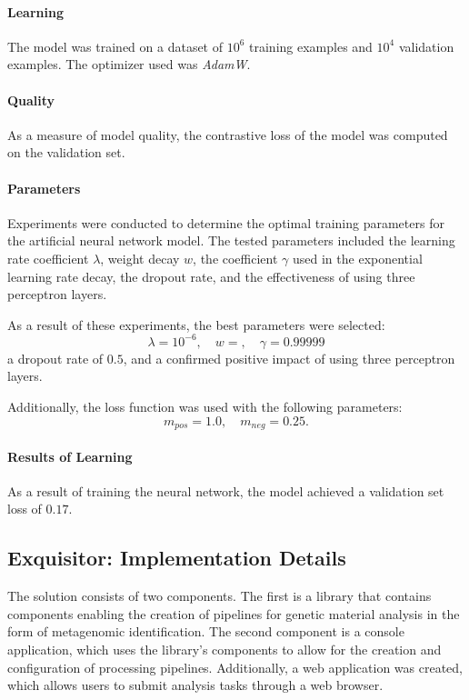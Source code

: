 \documentclass[pdflatex,sn-vancouver-num]{sn-jnl}%
\begin{document}
                \paragraph{Learning}
                The model was trained on a dataset of $10^{6}$ training examples and $10^{4}$ validation examples. The optimizer used was \textit{AdamW}\cite{Loshchilov2017DecoupledWD}.

                \paragraph{Quality}
                As a measure of model quality, the contrastive loss of the model was computed on the validation set.

                \paragraph{Parameters}
                Experiments were conducted to determine the optimal training parameters for the artificial neural network model. The tested parameters included the learning rate coefficient \( \lambda \), weight decay \( w \), the coefficient \( \gamma \) used in the exponential learning rate decay, the dropout rate, and the effectiveness of using three perceptron layers.

                As a result of these experiments, the best parameters were selected:
                \[
                \lambda = 10^{-6}, \quad w = , \quad \gamma = 0.99999
                \]
                a dropout rate of \( 0.5 \), and a confirmed positive impact of using three perceptron layers.

                Additionally, the loss function was used with the following parameters:
                \[
                m_{pos} = 1.0, \quad m_{neg} = 0.25.
                \]


                \paragraph{Results of Learning}
                As a result of training the neural network, the model achieved a validation set loss of $0.17$.


        \subsection{Exquisitor: Implementation Details}
            The solution consists of two components. The first is a library that contains components enabling the creation of pipelines for genetic material analysis in the form of metagenomic identification. The second component is a console application, which uses the library's components to allow for the creation and configuration of processing pipelines. Additionally, a web application was created, which allows users to submit analysis tasks through a web browser.
\end{document}
